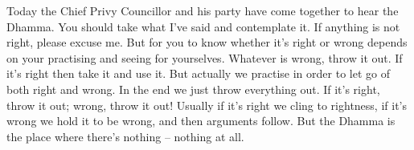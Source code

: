 Today the Chief Privy Councillor and his party have come together to hear the Dhamma. You should take what I've said and contemplate it. If anything is not right, please excuse me. But for you to know whether it's right or wrong depends on your practising and seeing for yourselves. Whatever is wrong, throw it out. If it's right then take it and use it. But actually we practise in order to let go of both right and wrong. In the end we just throw everything out. If it's right, throw it out; wrong, throw it out! Usually if it's right we cling to rightness, if it's wrong we hold it to be wrong, and then arguments follow. But the Dhamma is the place where there's nothing -- nothing at all.
